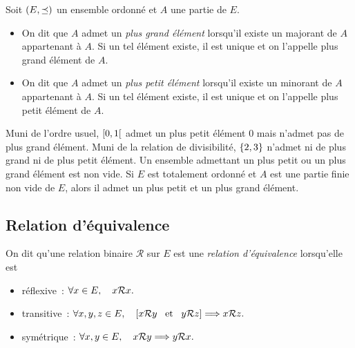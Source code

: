 \documentclass{magnolia}
\begin{document}

\begin{definition}[utile=-3]
Soit $\left(E,\preceq\right)$ un ensemble ordonné et $A$ une partie de $E$.
\begin{itemize}
\item On dit que $A$ admet un \emph{plus grand élément} lorsqu'il existe un majorant
  de $A$ appartenant à $A$. Si un tel élément existe, il est unique et on
  l'appelle plus grand élément de $A$.
\item On dit que $A$ admet un \emph{plus petit élément} lorsqu'il existe un minorant
  de $A$ appartenant à $A$. Si un tel élément existe, il est unique et on
  l'appelle plus petit élément de $A$.
\end{itemize}
\end{definition}

\begin{remarques}
\remarque Muni de l'ordre usuel, $\left[0,1\right[$ admet un plus petit élément 0
  mais n'admet pas de plus grand élément. Muni de la relation de divisibilité,
  $\left\{2,3\right\}$ n'admet ni de plus grand ni de plus petit élément.
\remarque Un ensemble admettant un plus petit ou un plus grand élément est non
   vide.
\remarque Si $E$ est totalement ordonné et $A$ est une partie finie non vide de
  $E$, alors il admet un plus petit et un plus grand élément.
\end{remarques}

\subsection{Relation d'équivalence}

\begin{definition}[utile=-3]
On dit qu'une relation binaire $\mathcal{R}$ sur $E$ est une
\emph{relation d'équivalence} lorsqu'elle est
\begin{itemize}
\item réflexive~: $\forall x\in E ,\quad x\mathcal{R} x.$
\item transitive~: $\forall x,y,z\in E ,\quad \left[x\mathcal{R} y \quad\!\text{et}\quad\!
  y\mathcal{R} z\right] \Longrightarrow x\mathcal{R} z.$
\item symétrique~: $\forall x,y\in E ,\quad x\mathcal{R} y \Longrightarrow
  y\mathcal{R} x.$
\end{itemize}
\end{definition}
\end{document}

